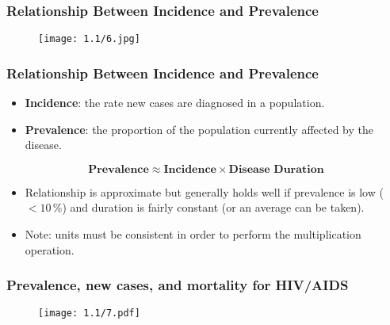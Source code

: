 \subsubsection*{Relationship Between Incidence and Prevalence}
\begin{figure}[H]
    \centering
    \texttt{[image: 1.1/6.jpg]}
\end{figure}
\subsubsection*{Relationship Between Incidence and Prevalence}
\begin{itemize}
    \item \textbf{Incidence}: the rate new cases are diagnosed in a population.
    \item \textbf{Prevalence}: the proportion of the population currently affected by the disease.
\end{itemize}
\begin{Regular}
    \[ \textbf{Prevalence}\approx \textbf{Incidence}\times \textbf{Disease Duration} \]
\end{Regular}
\begin{itemize}
    \item Relationship is approximate but generally holds well if prevalence is low ($<10\,$\%)
          and duration is fairly constant (or an average can be taken).
    \item Note: units must be consistent in order to perform the multiplication operation.
\end{itemize}
\subsubsection*{Prevalence, new cases, and mortality for HIV/AIDS}
\begin{figure}[H]
    \centering
    \texttt{[image: 1.1/7.pdf]}
\end{figure}
